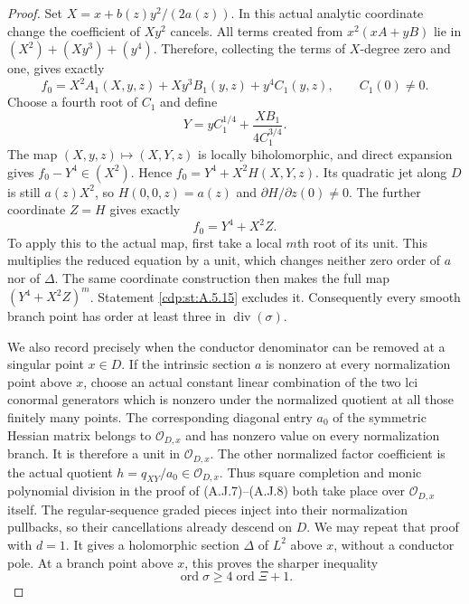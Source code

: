 \begin{proof}
Set $X=x+b(z)y^2/(2a(z))$. In this actual analytic
coordinate change the coefficient of $Xy^2$ cancels.
All terms created from $x^2(xA+yB)$ lie in
$(X^2)+(Xy^3)+(y^4)$. Therefore, collecting the
terms of $X$-degree zero and one, gives exactly
\[
 f_0=X^2A_1(X,y,z)+Xy^3B_1(y,z)+y^4C_1(y,z),
 \qquad C_1(0)\ne0.
\]
Choose a fourth root of $C_1$ and define
\[
 Y=yC_1^{1/4}+
                  \frac{XB_1}{4C_1^{3/4}}.
                                                        \tag{A.T.11}\label{cdp:eq:A.T.11}
\]
The map $(X,y,z)\mapsto(X,Y,z)$ is locally
biholomorphic, and direct expansion gives
$f_0-Y^4\in(X^2)$. Hence $f_0=Y^4+X^2H(X,Y,z)$.
Its quadratic jet along $D$ is still $a(z)X^2$,
so $H(0,0,z)=a(z)$ and $\partial H/\partial z(0)\ne0$.
The further coordinate $Z=H$ gives exactly
\[
                         f_0=Y^4+X^2Z.             \tag{A.T.12}\label{cdp:eq:A.T.12}
\]
To apply this to the actual map, first take a local
$m$th root of its unit. This multiplies the reduced
equation by a unit, which changes neither zero order
of $a$ nor of $\Delta$. The same coordinate construction
then makes the full map $(Y^4+X^2Z)^m$.
Statement \ref{cdp:st:A.5.15} excludes it. Consequently every
smooth branch point has order at least three in
$\operatorname{div}(\sigma)$.

We also record precisely when the conductor denominator
can be removed at a singular point $x\in D$.
If the intrinsic section $a$ is nonzero at every
normalization point above $x$, choose an actual
constant linear combination of the two lci conormal
generators which is nonzero under the normalized
quotient at all those finitely many points. The
corresponding diagonal entry $a_0$ of the symmetric
Hessian matrix belongs to $\mathcal O_{D,x}$ and
has nonzero value on every normalization branch.
It is therefore a unit in $\mathcal O_{D,x}$.
The other normalized factor coefficient is the
actual quotient $h=q_{XY}/a_0\in\mathcal O_{D,x}$.
Thus square completion and monic polynomial division
in the proof of (A.J.7)--(A.J.8) both take place
over $\mathcal O_{D,x}$ itself. The regular-sequence
graded pieces inject into their normalization
pullbacks, so their cancellations already descend
on $D$. We may repeat that proof with $d=1$.
It gives a holomorphic section $\Delta$ of $L^2$
above $x$, without a conductor pole. At a branch
point above $x$, this proves the sharper inequality
\[
 \operatorname{ord}\sigma\ge
                        4\operatorname{ord}\Xi+1.
                                                        \tag{A.T.13}\label{cdp:eq:A.T.13}
\]


\end{proof}
